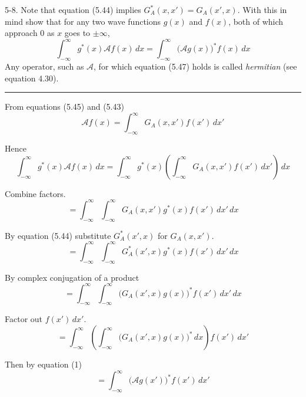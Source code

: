 \documentclass[12pt]{article}
\begin{document}
5-8.
Note that equation (5.44) implies $G_A^*(x,x')=G_A(x',x)$.
With this in mind show that for any two wave functions
$g(x)$ and $f(x)$, both of which approach 0 as $x$ goes to $\pm\infty$,
\begin{equation*}
\int_{-\infty}^\infty
g^*(x)\mathcal Af(x)\,dx=
\int_{-\infty}^\infty
\big(\mathcal Ag(x)\big)^*f(x)\,dx
\tag{5.47}
\end{equation*}
Any operator, such as $\mathcal A$, for which equation (5.47)
holds is called {\it hermitian} (see equation 4.30).

\bigskip
\hrule

\bigskip
From equations (5.45) and (5.43)
\begin{equation*}
\mathcal Af(x)=\int_{-\infty}^\infty G_A(x,x')f(x')\,dx'
\tag{1}
\end{equation*}

Hence
\begin{equation*}
\int_{-\infty}^\infty g^*(x)\mathcal Af(x)\,dx
=\int_{-\infty}^\infty g^*(x)
\left(\int_{-\infty}^\infty G_A(x,x')f(x')\,dx'\right)
\,dx
\end{equation*}

Combine factors.
\begin{equation*}
{}=\int_{-\infty}^\infty
\int_{-\infty}^\infty G_A(x,x')g^*(x)f(x')\,dx'
\,dx
\end{equation*}

By equation (5.44) substitute $G_A^*(x',x)$ for $G_A(x,x')$.
\begin{equation*}
{}=\int_{-\infty}^\infty
\int_{-\infty}^\infty G_A^*(x',x)g^*(x)f(x')\,dx'
\,dx
\end{equation*}

By complex conjugation of a product
\begin{equation*}
{}=\int_{-\infty}^\infty
\int_{-\infty}^\infty\big(G_A(x',x)g(x)\big)^*f(x')\,dx'
\,dx
\end{equation*}

Factor out $f(x')\,dx'$.
\begin{equation*}
{}=\int_{-\infty}^\infty
\left(\int_{-\infty}^\infty\big(G_A(x',x)g(x)\big)^*\,dx\right)f(x')\,dx'
\end{equation*}

Then by equation (1)
\begin{equation*}
{}=\int_{-\infty}^\infty\big(\mathcal Ag(x')\big)^*f(x')\,dx'
\end{equation*}
\end{document}
